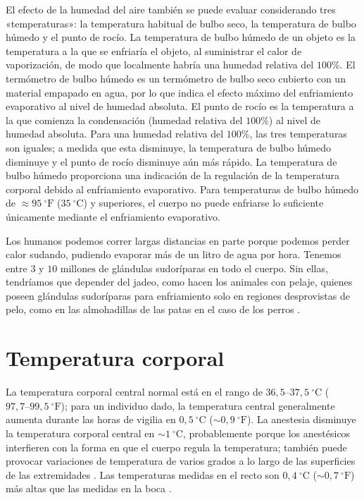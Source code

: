 \documentclass[12pt]{book}
\begin{document}
El efecto de la humedad del aire también se puede evaluar considerando tres «temperaturas»: la temperatura habitual de bulbo seco, la temperatura de bulbo húmedo y el punto de rocío. La temperatura de bulbo húmedo de un objeto es la temperatura a la que se enfriaría el objeto, al suministrar el calor de vaporización, de modo que localmente habría una humedad relativa del $100\%$. El termómetro de bulbo húmedo es un termómetro de bulbo seco cubierto con un material empapado en agua, por lo que indica el efecto máximo del enfriamiento evaporativo al nivel de humedad absoluta. El punto de rocío es la temperatura a la que comienza la condensación (humedad relativa del $100\%$) al nivel de humedad absoluta. Para una humedad relativa del $100\%$, las tres temperaturas son iguales; a medida que esta disminuye, la temperatura de bulbo húmedo disminuye y el punto de rocío disminuye aún más rápido. La temperatura de bulbo húmedo proporciona una indicación de la regulación de la temperatura corporal debido al enfriamiento evaporativo. Para temperaturas de bulbo húmedo de $\approx 95\ ^\circ\text{F}$ ($35\ ^\circ\text{C}$) y superiores, el cuerpo no puede enfriarse lo suficiente únicamente mediante el enfriamiento evaporativo.

Los humanos podemos correr largas distancias en parte porque podemos perder calor sudando, pudiendo evaporar más de un litro de agua por hora. Tenemos entre $3$ y $10\text{ millones}$ de glándulas sudoríparas en todo el cuerpo. Sin ellas, tendríamos que depender del jadeo, como hacen los animales con pelaje, quienes poseen glándulas sudoríparas para enfriamiento solo en regiones desprovistas de pelo, como en las almohadillas de las patas en el caso de los perros \cite{44,56,91}.

\section{Temperatura corporal}

La temperatura corporal central normal está en el rango de $36{,}5\text{--}37{,}5\ ^\circ\text{C}$ ($97{,}7\text{--}99{,}5\ ^\circ\text{F}$); para un individuo dado, la temperatura central generalmente aumenta durante las horas de vigilia en $0{,}5\ ^\circ\text{C}$ ($\sim 0{,}9\ ^\circ\text{F}$). La anestesia disminuye la temperatura corporal central en $\sim 1\ ^\circ\text{C}$, probablemente porque los anestésicos interfieren con la forma en que el cuerpo regula la temperatura; también puede provocar variaciones de temperatura de varios grados a lo largo de las superficies de las extremidades \cite{37}. Las temperaturas medidas en el recto son $0{,}4\ ^\circ\text{C}$ ($\sim 0{,}7\ ^\circ\text{F}$) más altas que las medidas en la boca \cite{59}.
\end{document}
